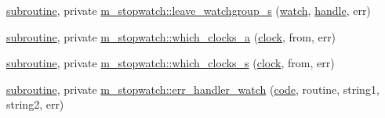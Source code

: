 \begin{DoxyCompactItemize}
\item 
\hyperlink{M__stopwatch_83_8txt_acfbcff50169d691ff02d4a123ed70482}{subroutine}, private \hyperlink{namespacem__stopwatch_a9acf515866a63a203530c03d8fe59b98}{m\+\_\+stopwatch\+::leave\+\_\+watchgroup\+\_\+s} (\hyperlink{read__watch_83_8txt_ad2129669fa47b8899641309620add095}{watch}, \hyperlink{leave__watchgroup_83_8txt_ad6c5ebd26f707ef8da754021612a7c8d}{handle}, err)
\item 
\hyperlink{M__stopwatch_83_8txt_acfbcff50169d691ff02d4a123ed70482}{subroutine}, private \hyperlink{namespacem__stopwatch_a38967ac58362f42dc3c5cc27acbdb24f}{m\+\_\+stopwatch\+::which\+\_\+clocks\+\_\+a} (\hyperlink{stop__watch_83_8txt_a148c035b430d6edf5413dbd2704facfb}{clock}, from, err)
\item 
\hyperlink{M__stopwatch_83_8txt_acfbcff50169d691ff02d4a123ed70482}{subroutine}, private \hyperlink{namespacem__stopwatch_a2438913aaa1966dfa18811ff048d642b}{m\+\_\+stopwatch\+::which\+\_\+clocks\+\_\+s} (\hyperlink{stop__watch_83_8txt_a148c035b430d6edf5413dbd2704facfb}{clock}, from, err)
\item 
\hyperlink{M__stopwatch_83_8txt_acfbcff50169d691ff02d4a123ed70482}{subroutine}, private \hyperlink{namespacem__stopwatch_a8129c70e425409f9dc6666729f5b5c9c}{m\+\_\+stopwatch\+::err\+\_\+handler\+\_\+watch} (\hyperlink{ufpp__overview_81_8txt_a74a0615f2d9c4a398d9126096f8092f8}{code}, routine, string1, string2, err)
\end{DoxyCompactItemize}
